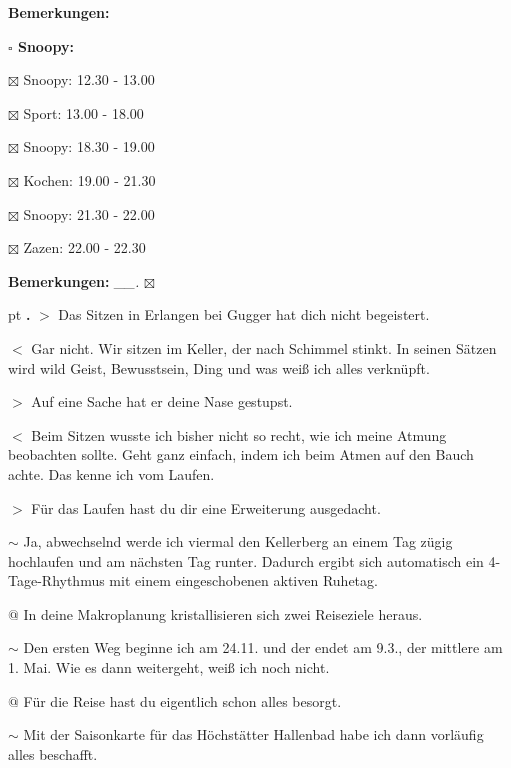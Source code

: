 \documentclass[10pt,a4paper]{article}
\newcounter{notec}
\newcommand\notep[1]{%
  \stepcounter{notec}
  \vskip #1pt
  {\bf\arabic{notec}.}
}
\newcommand\prop[1] {{\color {alizarin} {\bf #1}}}             %
\newcommand\mand[1] {{\color {burntorange} {\bf #1}}}          %
\newcommand\bottomspace{\vskip 4pt}
\newcommand\n[1] { {\sl #1.} \hskip 5pt }
\begin{document}
\begin{mdframed}[style=daystyle]
\begin{labeling}{{\mand {Bemerkungen:}}}
\begin{minipage}{0.75\textwidth}
\begin{labeling}{\prop {$\square$ {Snoopy:}}}
      \item[$\boxtimes$ Snoopy:] 12.30 - 13.00
      \item[$\boxtimes$ Sport:]  13.00 - 18.00
        
      \item[$\boxtimes$ Snoopy:] 18.30 - 19.00
      \item[$\boxtimes$ Kochen:] 19.00 - 21.30
        
      \item[$\boxtimes$ Snoopy:] 21.30 - 22.00
      \item[$\boxtimes$ Zazen:]  22.00 - 22.30
      \end{labeling}
    \end{minipage}
    \bottomspace
  \item[{\mand {Bemerkungen:}}]  \n{\_\_} $\boxtimes$
  \end{labeling}
    
  \setcounter{notec}{0}
  
  \notep 0 $>$ Das Sitzen in Erlangen bei Gugger hat dich nicht begeistert.

  \vskip 2pt
  $<$ Gar nicht. Wir sitzen im Keller, der nach Schimmel stinkt. In seinen Sätzen
  wird wild Geist, Bewusstsein, Ding und was weiß ich alles verknüpft.

  \vskip 2pt
  $>$ Auf eine Sache hat er deine Nase gestupst.

  \vskip 2pt
  $<$ Beim Sitzen wusste ich bisher nicht so recht, wie ich meine Atmung
  beobachten sollte. Geht ganz einfach, indem ich beim Atmen auf den Bauch
  achte. Das kenne ich vom Laufen.

  \vskip 2pt
  $>$ Für das Laufen hast du dir eine Erweiterung ausgedacht.

  \vskip 2pt
  $\sim$ Ja, abwechselnd werde ich viermal den Kellerberg an einem Tag zügig
  hochlaufen und am nächsten Tag runter. Dadurch ergibt sich automatisch ein
  4-Tage-Rhythmus mit einem eingeschobenen aktiven Ruhetag.

  \vskip 2pt
  $@$ In deine Makroplanung kristallisieren sich zwei Reiseziele heraus.

  \vskip 2pt
  $\sim$ Den ersten Weg beginne ich am 24.11. und der endet am 9.3., der
  mittlere am 1. Mai. Wie es dann weitergeht, weiß ich noch nicht.

  \vskip 2pt
  $@$ Für die Reise hast du eigentlich schon alles besorgt.

  \vskip 2pt
  $\sim$ Mit der Saisonkarte für das Höchstätter Hallenbad habe ich dann
  vorläufig alles beschafft.


\end{mdframed}
\end{document}
